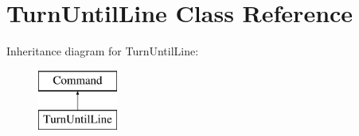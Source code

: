 \hypertarget{classTurnUntilLine}{\section{Turn\-Until\-Line Class Reference}
\label{classTurnUntilLine}
}
Inheritance diagram for Turn\-Until\-Line\-:\begin{figure}[H]
\begin{center}
\leavevmode
\includegraphics[height=2.000000cm]{classTurnUntilLine}
\end{center}
\end{figure}
